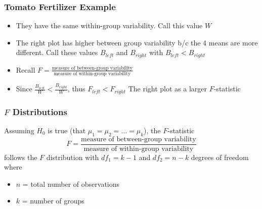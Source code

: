 \documentclass[handout]{beamer}
\newcommand{\blue}[1]{\textcolor{blue2}{#1}}
\begin{document}
\begin{frame}
\frametitle{Tomato Fertilizer Example}

%
%
\begin{itemize}
\pause \item They have the \blue{same within-group} variability.  Call this value $W$
\pause \item The right plot has \blue{higher between group variability}  b/c the 4 means are more different.  Call these values $B_{left}$ and $B_{right}$ with $B_{left} < B_{right}$
\pause \item Recall $F = \frac{\mbox{measure of between-group variability}}{\mbox{measure of within-group variability}}$
\pause \item Since $\frac{B_{left}}{W} < \frac{B_{right}}{W}$, thus $F_{left} < F_{right}$
\pause The right plot as a larger $F$-statistic
\end{itemize}

\end{frame}


\begin{frame}
\frametitle{$F$ Distributions}
%
%
\blue{Assuming $H_0$ is true} (that $\mu_1 = \mu_2 = \ldots = \mu_k$), the $F$-statistic
\[
F = \frac{\mbox{measure of between-group variability}}{\mbox{measure of within-group variability}}
\]
follows the \blue{$F$ distribution with $df_1=k-1$ and $df_2=n-k$ degrees of freedom } where
\begin{itemize}
\pause \item $n$ = \blue{total} number of observations
\item $k$ = number of groups
\end{itemize}
 
\end{frame}
\end{document}
